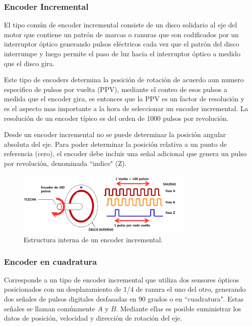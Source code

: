 \documentclass[11pt, a4paper]{article}
\begin{document}
\subsubsection{Encoder Incremental}
 El tipo común de encoder incremental consiste de un disco solidario al eje del motor que contiene un patrón de marcas o ranuras que son codificados por un interruptor óptico generando pulsos eléctricos cada vez que el patrón del disco interrumpe y luego permite el paso de luz hacia el interruptor óptico a medido que el disco gira. 

 Este tipo de encoders determina la posición de rotación de acuerdo  aun numero especifico de pulsos por vuelta (PPV), mediante el conteo de esos pulsos a medida que el encoder gira, es entonces que la PPV es un factor de resolución y es el aspecto mas importante a la hora de seleccionar un encoder incremental.  La resolución de un encoder típico es del orden de 1000 pulsos por revolución.

 Desde un encoder incremental no se puede determinar la posición angular absoluta del eje. Para poder determinar la posición relativa a un punto de referencia (cero), el encoder debe incluir una señal adicional que genera un pulso por revolución, denominada ``indice" (Z).

\begin{figure}[h]
	\centering
	\includegraphics[width=0.8\textwidth]{Imagenes/encoder_incremental.jpg}
	\caption{Estructura interna de un encoder incremental.}
	\label{fig:encoder_incremental}
\end{figure} 

\subsubsection{Encoder en cuadratura}
Corresponde a un tipo de encoder incremental que utiliza dos sensores ópticos posicionados con un desplazamiento de 1/4 de ranura el uno del otro, generando dos señales de pulsos digitales desfasadas en 90 grados o en ``cuadratura". Estas señales se llaman comúnmente $A$ y $B$. Mediante ellas es posible suministrar los datos de posición, velocidad y dirección de rotación del eje.
\end{document}
